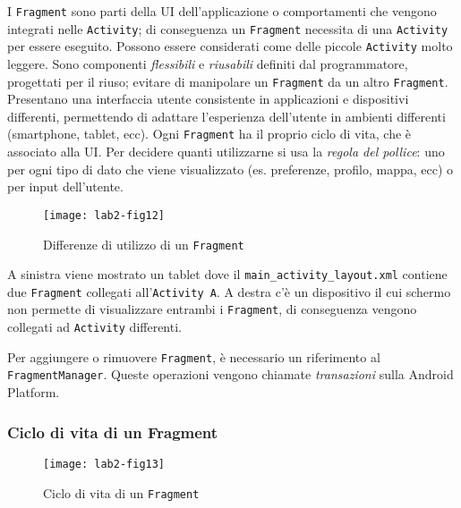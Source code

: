 I \texttt{Fragment} sono parti della UI dell'applicazione o comportamenti che
vengono integrati nelle \texttt{Activity}; di conseguenza un \texttt{Fragment}
necessita di una \texttt{Activity} per essere eseguito. Possono essere
considerati come delle piccole \texttt{Activity} molto leggere.
Sono componenti \textit{flessibili} e \textit{riusabili} definiti dal
programmatore, progettati per il riuso; evitare di manipolare un
\texttt{Fragment} da un altro \texttt{Fragment}. Presentano una interfaccia
utente consistente in applicazioni e dispositivi differenti, permettendo di
adattare l'esperienza dell'utente in ambienti differenti (smartphone, tablet,
ecc).
Ogni \texttt{Fragment} ha il proprio ciclo di vita, che è associato alla UI. Per
decidere quanti utilizzarne si usa la \textit{regola del pollice}: uno per ogni
tipo di dato che viene visualizzato (es. preferenze, profilo, mappa, ecc) o per
input dell'utente.

\begin{figure}[htbp]
        \centering
        \texttt{[image: lab2-fig12]}
        \caption[Fragment Tablet Smartphone]{Differenze di utilizzo di un
\texttt{Fragment}}\label{img:lab2-fig12}
\end{figure}

A sinistra viene mostrato un tablet dove il \texttt{main\_activity\_layout.xml}
contiene due \texttt{Fragment} collegati all'\texttt{Activity A}. A destra c'è
un dispositivo il cui schermo non permette di visualizzare entrambi i
\texttt{Fragment}, di conseguenza vengono collegati ad \texttt{Activity}
differenti.

Per aggiungere o rimuovere \texttt{Fragment}, è necessario un riferimento al
\texttt{FragmentManager}. Queste operazioni vengono chiamate
\textit{transazioni} sulla Android Platform.

\subsubsection{Ciclo di vita di un Fragment}

\begin{figure}[htbp]
        \centering
        \texttt{[image: lab2-fig13]}
        \caption[Ciclo di vita Fragment]{Ciclo di vita di un
\texttt{Fragment}}\label{img:lab2-fig13}
\end{figure}

